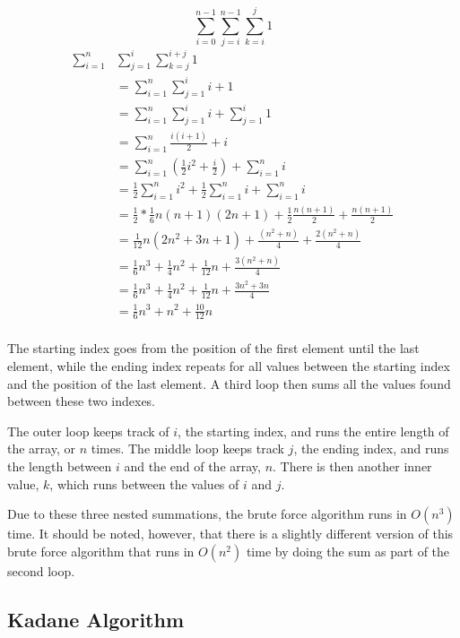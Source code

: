 \documentclass[10pt, letterpaper]{article}
\begin{document}
	\[\sum_{i = 0}^{n-1}\sum_{j = i}^{n-1}\sum_{k = i}^{j}1\]
  \begin{equation}
    \begin{split}
      \sum_{i=1}^{n}&\sum_{j=1}^{i}\sum_{k=j}^{i+j}1 \\
      &=\sum_{i=1}^{n}\sum_{j=1}^{i}i+1 \\
      &=\sum_{i=1}^{n}\sum_{j=1}^{i}i+\sum_{j=1}^{i}1 \\
      &=\sum_{i=1}^{n}\frac{i(i+1)}{2}+i \\
      &=\sum_{i=1}^{n}(\frac{1}{2}i^2+\frac{i}{2})+\sum_{i=1}^{n}i \\
      &=\frac{1}{2}\sum_{i=1}^{n}i^2+\frac{1}{2}\sum_{i=1}^{n}i+\sum_{i=1}^{n}i \\
      &=\frac{1}{2}*\frac{1}{6}n(n+1)(2n+1)+\frac{1}{2}\frac{n(n+1)}{2}+\frac{n(n+1)}{2} \\
      &=\frac{1}{12}n(2n^2+3n+1)+\frac{(n^2+n)}{4}+\frac{2(n^2+n)}{4} \\
      &=\frac{1}{6}n^3+\frac{1}{4}n^2+\frac{1}{12}n+\frac{3(n^2+n)}{4} \\
      &=\frac{1}{6}n^3+\frac{1}{4}n^2+\frac{1}{12}n+\frac{3n^2+3n}{4} \\
      &=\frac{1}{6}n^3+n^2+\frac{10}{12}n \\
    \end{split}
  \end{equation}

	The starting index goes from the position of the first element until the last element, while the ending index repeats for all values between the starting index and the position of the last element.
	A third loop then sums all the values found between these two indexes.

	The outer loop keeps track of $i$, the starting index, and runs the entire length of the array, or $n$ times.
	The middle loop keeps track $j$, the ending index, and runs the length between $i$ and the end of the array, $n$.
	There is then another inner value, $k$, which runs between the values of $i$ and $j$.

	Due to these three nested summations, the brute force algorithm runs in $O(n^3)$ time.
	It should be noted, however, that there is a slightly different version of this brute force algorithm that runs in $O(n^2)$ time by doing the sum as part of the second loop.

	\subsection{Kadane Algorithm}
\end{document}
